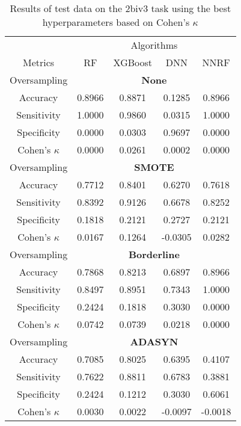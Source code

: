 \begin{table}[!htb]
\centering
\caption{Results of test data on the 2biv3 task using the best hyperparameters based on Cohen's $\kappa$}
\label{tab:2biv3_test_results}
\begin{tabular}{c | c c c c}
\hline
 & \multicolumn{4}{c}{Algorithms}\\ 
Metrics &RF & XGBoost & DNN & NNRF\\ 
\hline
Oversampling &\multicolumn{4}{|c}{\textbf{None}}\\ 
\hline
Accuracy & 0.8966 & 0.8871 & 0.1285 & 0.8966\\ 
Sensitivity & 1.0000 & 0.9860 & 0.0315 & 1.0000\\ 
Specificity & 0.0000 & 0.0303 & 0.9697 & 0.0000\\ 
Cohen's $\kappa$ & 0.0000 & 0.0261 & 0.0002 & 0.0000\\ 
\hline
Oversampling &\multicolumn{4}{|c}{\textbf{SMOTE}}\\ 
\hline
Accuracy & 0.7712 & 0.8401 & 0.6270 & 0.7618\\ 
Sensitivity & 0.8392 & 0.9126 & 0.6678 & 0.8252\\ 
Specificity & 0.1818 & 0.2121 & 0.2727 & 0.2121\\ 
Cohen's $\kappa$ & 0.0167 & 0.1264 & -0.0305 & 0.0282\\ 
\hline
Oversampling &\multicolumn{4}{|c}{\textbf{Borderline}}\\ 
\hline
Accuracy & 0.7868 & 0.8213 & 0.6897 & 0.8966\\ 
Sensitivity & 0.8497 & 0.8951 & 0.7343 & 1.0000\\ 
Specificity & 0.2424 & 0.1818 & 0.3030 & 0.0000\\ 
Cohen's $\kappa$ & 0.0742 & 0.0739 & 0.0218 & 0.0000\\ 
\hline
Oversampling &\multicolumn{4}{|c}{\textbf{ADASYN}}\\ 
\hline
Accuracy & 0.7085 & 0.8025 & 0.6395 & 0.4107\\ 
Sensitivity & 0.7622 & 0.8811 & 0.6783 & 0.3881\\ 
Specificity & 0.2424 & 0.1212 & 0.3030 & 0.6061\\ 
Cohen's $\kappa$ & 0.0030 & 0.0022 & -0.0097 & -0.0018\\ 
\hline
\end{tabular}
\end{table}

